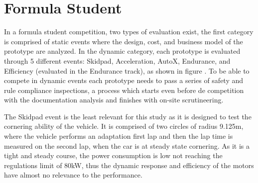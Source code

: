 
\section{Formula Student}

In a formula student competition, two types of evaluation exist, the first category is comprised of static events where the design, cost, and business model of the prototype are analyzed. In the dynamic category, each prototype is evaluated through 5 different events: Skidpad, Acceleration, AutoX, Endurance, and Efficiency (evaluated in the Endurance track), as shown in figure . To be able to compete in dynamic events each prototype needs to pass a series of safety and rule compliance inspections, a process which starts even before de competition with the documentation analysis and finishes with on-site scrutineering.

The Skidpad event is the least relevant for this study as it is designed to test the cornering ability of the vehicle. It is comprised of two circles of radius 9.125m, where the vehicle performs an adaptation first lap and then the lap time is measured on the second lap, when the car is at steady state cornering. As it is a tight and steady course, the power consumption is low not reaching the regulations limit of 80kW, thus the dynamic response and efficiency of the motors have almost no relevance to the performance. 

